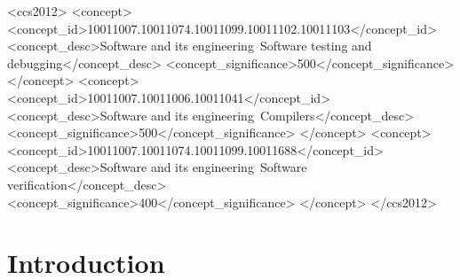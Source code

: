 \documentclass[sigconf,review,anonymous=false]{acmart}
\theoremstyle{definition}
\begin{document}
\begin{abstract}
Through extensive differential campaigns, CovDiff-Lite discovered and isolated \textbf{9 previously unknown upstream compiler bugs} across Clang/LLVM and GCC, including 5 officially accepted LLVM defects (\#243402, \#243423, \#243451, \#243464, \#243547), 3 GCC Bugzilla defects confirmed with \texttt{wrong-debug} by the GCC Release Manager (PR 128800, PR 128804, PR 128805), and 1 triaged GCC defect (PR 128827). We report on a massive 30,000-execution differential campaign (100.0\% pass rate) demonstrating statistically significant optimization degradation in GCC (Wilcoxon $W=0, p < 10^{-15}$; Cliff's $\delta = 0.413$), profile industrial production systems (SQLite, zlib, cJSON) revealing a 30,663-line unmapped gap (+65.9\%) and persistent CI quality gate flip conflicts, and quantify downstream distortion in Spectrum-Based Fault Localization (SBFL).
\end{abstract}

\begin{CCSXML}
<ccs2012>
<concept>
<concept_id>10011007.10011074.10011099.10011102.10011103</concept_id>
<concept_desc>Software and its engineering~Software testing and debugging</concept_desc>
<concept_significance>500</concept_significance>
</concept>
<concept>
<concept_id>10011007.10011006.10011041</concept_id>
<concept_desc>Software and its engineering~Compilers</concept_desc>
<concept_significance>500</concept_significance>
</concept>
<concept>
<concept_id>10011007.10011074.10011099.10011688</concept_id>
<concept_desc>Software and its engineering~Software verification</concept_desc>
<concept_significance>400</concept_significance>
</concept>
</ccs2012>
\end{CCSXML}



\maketitle

\section{Introduction}
\end{document}
